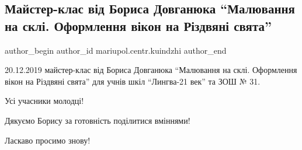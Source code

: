  
 
 
 
 

\subsection{Майстер-клас від Бориса Довганюка \enquote{Малювання на склі. Оформлення вікон на Різдвяні свята}}
\label{sec:20_12_2019.fb.mariupol.centr.kuindzhi.1.majster_klass_borys_dovganjuk_maljuvannja_na_skli}

\ifcmt
 author_begin
   author_id mariupol.centr.kuindzhi
 author_end
\fi

20.12.2019 майстер-клас від Бориса Довганюка \enquote{Малювання на склі. Оформлення
вікон на Різдвяні свята}  для учнів  шкіл \enquote{Лингва-21 век} та ЗОШ № 31.

Усі учасники молодці!

Дякуємо Борису за готовність поділитися вміннями!

Ласкаво просимо знову!
